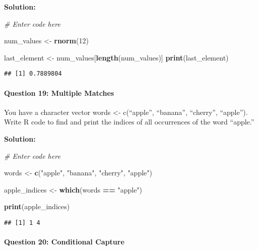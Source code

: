 \documentclass[
]{article}
\newenvironment{Shaded}{\begin{snugshade}}{\end{snugshade}}
\newcommand{\CommentTok}[1]{\textcolor[rgb]{0.56,0.35,0.01}{\textit{#1}}}
\newcommand{\DecValTok}[1]{\textcolor[rgb]{0.00,0.00,0.81}{#1}}
\newcommand{\FunctionTok}[1]{\textcolor[rgb]{0.13,0.29,0.53}{\textbf{#1}}}
\newcommand{\NormalTok}[1]{#1}
\newcommand{\OtherTok}[1]{\textcolor[rgb]{0.56,0.35,0.01}{#1}}
\newcommand{\SpecialCharTok}[1]{\textcolor[rgb]{0.81,0.36,0.00}{\textbf{#1}}}
\newcommand{\StringTok}[1]{\textcolor[rgb]{0.31,0.60,0.02}{#1}}
\begin{document}
\textbf{Solution:}

\begin{Shaded}
\begin{Highlighting}[]
\CommentTok{\# Enter code here}

\NormalTok{num\_values }\OtherTok{\textless{}{-}} \FunctionTok{rnorm}\NormalTok{(}\DecValTok{12}\NormalTok{)  }

\NormalTok{last\_element }\OtherTok{\textless{}{-}}\NormalTok{ num\_values[}\FunctionTok{length}\NormalTok{(num\_values)]}
\FunctionTok{print}\NormalTok{(last\_element)}
\end{Highlighting}
\end{Shaded}

\begin{verbatim}
## [1] 0.7889804
\end{verbatim}

\hypertarget{question-19-multiple-matches}{%
\paragraph{Question 19: Multiple
Matches}\label{question-19-multiple-matches}}

You have a character vector words \textless- c(``apple'', ``banana'',
``cherry'', ``apple''). Write R code to find and print the indices of
all occurrences of the word ``apple.''

\textbf{Solution:}

\begin{Shaded}
\begin{Highlighting}[]
\CommentTok{\# Enter code here}

\NormalTok{words }\OtherTok{\textless{}{-}} \FunctionTok{c}\NormalTok{(}\StringTok{"apple"}\NormalTok{, }\StringTok{"banana"}\NormalTok{, }\StringTok{"cherry"}\NormalTok{, }\StringTok{"apple"}\NormalTok{)}

\NormalTok{apple\_indices }\OtherTok{\textless{}{-}} \FunctionTok{which}\NormalTok{(words }\SpecialCharTok{==} \StringTok{"apple"}\NormalTok{)}

\FunctionTok{print}\NormalTok{(apple\_indices)}
\end{Highlighting}
\end{Shaded}

\begin{verbatim}
## [1] 1 4
\end{verbatim}

\hypertarget{question-20-conditional-capture}{%
\paragraph{Question 20: Conditional
Capture}\label{question-20-conditional-capture}}
\end{document}
